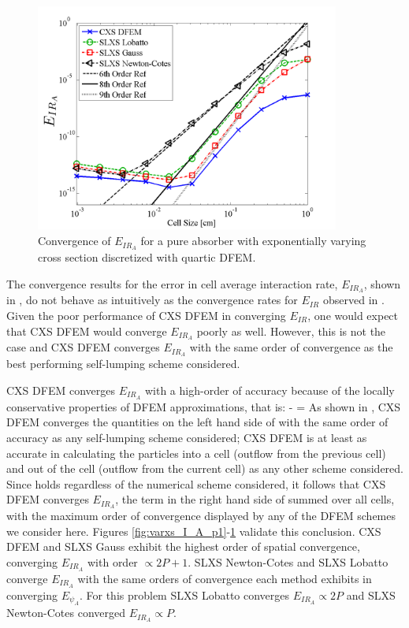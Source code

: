 \begin{figure}[!hbp]
\centering
\includegraphics[width=10cm]{chapter3_variable_xs/P4_VarXS_E_I_A.png}
\caption{Convergence of $E_{IR_A}$ for a pure absorber with exponentially varying cross section discretized with quartic DFEM.}
\label{fig:varxs_I_A_p4}
\end{figure}
The convergence results for the error in cell average interaction rate, $E_{IR_A}$, shown in , do not behave as intuitively as the convergence rates for $E_{IR}$ observed in .  
Given the poor performance of CXS DFEM in converging $E_{IR}$, one would expect that CXS DFEM would converge $E_{IR_A}$ poorly as well.  
However, this is not the case and CXS DFEM converges $E_{IR_A}$ with the same order of convergence as the best performing self-lumping scheme considered.

CXS DFEM converges $E_{IR_A}$ with a high-order of accuracy because of the locally conservative properties of DFEM approximations, that is:
\benum
{} -  =   \pep
\label{eq:chap3_balance}
\eenum
As shown in , CXS DFEM converges the quantities on the left hand side of  with the same order of accuracy as any self-lumping scheme considered; CXS DFEM is at least as accurate in calculating the particles into a cell (outflow from the previous cell) and out of the cell (outflow from the current cell) as any other scheme considered.
Since  holds regardless of the numerical scheme considered, it follows that CXS DFEM converges $E_{IR_A}$, the term in the right hand side of  summed over all cells, with the maximum order of convergence displayed by any of the DFEM schemes we consider here.
Figures \ref{fig:varxs_I_A_p1}-\ref{fig:varxs_I_A_p4} validate this conclusion.
CXS DFEM and SLXS Gauss exhibit the highest order of spatial convergence, converging $E_{IR_A}$ with order $\propto 2P + 1$.  
SLXS Newton-Cotes and SLXS Lobatto converge $E_{IR_A}$ with the same orders of convergence each method exhibits in converging $E_{\psi_A}$.
For this problem SLXS Lobatto converges $E_{IR_A} \propto 2P$ and SLXS Newton-Cotes converged $E_{IR_A} \propto P$.

